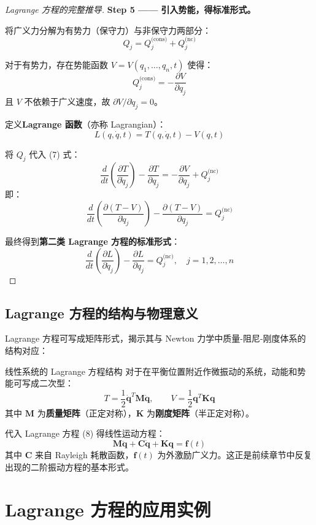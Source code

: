 \begin{proof}[Lagrange 方程的完整推导]
	\textbf{Step 5 —— 引入势能，得标准形式。}
	
	将广义力分解为有势力（保守力）与非保守力两部分：
	\[
	Q_j = Q_j^{\text{(cons)}} + Q_j^{\text{(nc)}}
	\]
	
	对于有势力，存在势能函数 $V = V(q_1, \ldots, q_n, t)$ 使得：
	\[
	Q_j^{\text{(cons)}} = -\frac{\partial V}{\partial q_j}
	\]
	且 $V$ 不依赖于广义速度，故 $\partial V / \partial \dot{q}_j = 0$。
	
	定义\textbf{Lagrange 函数}（亦称 Lagrangian）：
	\[
	L(q, \dot{q}, t) = T(q, \dot{q}, t) - V(q, t)
	\]
	
	将 $Q_j$ 代入 (7) 式：
	\[
	\frac{d}{dt} \left( \frac{\partial T}{\partial \dot{q}_j} \right) - \frac{\partial T}{\partial q_j} = -\frac{\partial V}{\partial q_j} + Q_j^{\text{(nc)}}
	\]
	即：
	\[
	\frac{d}{dt} \left( \frac{\partial (T - V)}{\partial \dot{q}_j} \right) - \frac{\partial (T - V)}{\partial q_j} = Q_j^{\text{(nc)}}
	\]
	
	最终得到\textbf{第二类 Lagrange 方程的标准形式}：
	\[
	\boxed{\frac{d}{dt} \left( \frac{\partial L}{\partial \dot{q}_j} \right) - \frac{\partial L}{\partial q_j} = Q_j^{\text{(nc)}}, \quad j = 1, 2, \ldots, n}
	\tag{8}
	\]
\end{proof}

\subsection{Lagrange 方程的结构与物理意义}

Lagrange 方程可写成矩阵形式，揭示其与 Newton 力学中质量-阻尼-刚度体系的结构对应：

\begin{corollary}{线性系统的 Lagrange 方程结构}
	对于在平衡位置附近作微振动的系统，动能和势能可写成二次型：
	\[
	T = \frac{1}{2} \dot{\mathbf{q}}^T \mathbf{M} \dot{\mathbf{q}}, \qquad V = \frac{1}{2} \mathbf{q}^T \mathbf{K} \mathbf{q}
	\]
	其中 $\mathbf{M}$ 为\textbf{质量矩阵}（正定对称），$\mathbf{K}$ 为\textbf{刚度矩阵}（半正定对称）。
	
	代入 Lagrange 方程 (8) 得线性运动方程：
	\[
	\mathbf{M} \ddot{\mathbf{q}} + \mathbf{C} \dot{\mathbf{q}} + \mathbf{K} \mathbf{q} = \mathbf{f}(t)
	\]
	其中 $\mathbf{C}$ 来自 Rayleigh 耗散函数，$\mathbf{f}(t)$ 为外激励广义力。这正是前续章节中反复出现的二阶振动方程的基本形式。
\end{corollary}

\section{Lagrange 方程的应用实例}

